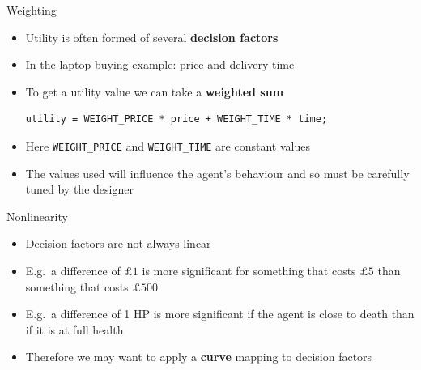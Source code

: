 \begin{frame}[fragile]{Weighting}
    \begin{itemize}
        \pause\item Utility is often formed of several \textbf{decision factors}
        \pause\item In the laptop buying example: price and delivery time
        \pause\item To get a utility value we can take a \textbf{weighted sum}
        \begin{lstlisting}
utility = WEIGHT_PRICE * price + WEIGHT_TIME * time;
        \end{lstlisting}
        \pause\item Here \lstinline{WEIGHT_PRICE} and \lstinline{WEIGHT_TIME} are constant values
        \pause\item The values used will influence the agent's behaviour and so must be carefully tuned by the designer
    \end{itemize}
\end{frame}

\begin{frame}{Nonlinearity}
    \begin{itemize}
        \pause\item Decision factors are not always linear
        \pause\item E.g.\ a difference of $\pounds 1$ is more significant for something that costs $\pounds 5$
            than something that costs $\pounds 500$
        \pause\item E.g.\ a difference of 1 HP is more significant if the agent is close to death
            than if it is at full health
        \pause\item Therefore we may want to apply a \textbf{curve} mapping to decision factors 
    \end{itemize}
\end{frame}

